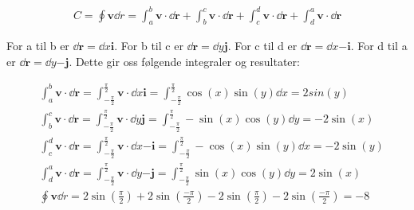 \begin{align*}
    C =  \oint \mathbf{v} \dd r
    =
    \int_{a}^{b} \mathbf{v} \cdot \dd \mathbf{r}
    +
    \int_{b}^{c} \mathbf{v} \cdot \dd \mathbf{r}
    +
    \int_{c}^{d} \mathbf{v} \cdot \dd \mathbf{r}
    +
    \int_{d}^{a} \mathbf{v} \cdot \dd \mathbf{r}
\end{align*}

For a til b er $\dd \mathbf{r} = \dd x \mathbf{i}$.
For b til c er $\dd \mathbf{r} = \dd y \mathbf{j}$.
For c til d er $\dd \mathbf{r} = \dd x \mathbf{-i}$.
For d til a er $\dd \mathbf{r} = \dd y \mathbf{-j}$.
Dette gir oss følgende integraler og resultater:

\begin{align*}
    &\int_{a}^{b} \mathbf{v} \cdot \dd \mathbf{r}
    =
    \int_{-\frac{\pi}{2}}^{\frac{\pi}{2}}
    \mathbf{v} \cdot \dd x \mathbf{i}
    =
    \int_{-\frac{\pi}{2}}^{\frac{\pi}{2}}
    \cos(x)\sin(y) \dd x
    = 2 sin(y)
    \\
    &\int_{b}^{c} \mathbf{v} \cdot \dd \mathbf{r}
    =
    \int_{-\frac{\pi}{2}}^{\frac{\pi}{2}}
    \mathbf{v} \cdot \dd y \mathbf{j}
    =
    \int_{-\frac{\pi}{2}}^{\frac{\pi}{2}}
    - \sin(x)\cos(y) \dd y
    = -2\sin(x)
    \\
    &\int_{c}^{d} \mathbf{v} \cdot \dd \mathbf{r}
    =
    \int_{-\frac{\pi}{2}}^{\frac{\pi}{2}}
    \mathbf{v} \cdot \dd x \mathbf{-i}
    =
    \int_{-\frac{\pi}{2}}^{\frac{\pi}{2}}
    -\cos(x)\sin(y) \dd x
    = -2 \sin(y)
    \\
    &\int_{d}^{a} \mathbf{v} \cdot \dd \mathbf{r}
    =
    \int_{-\frac{\pi}{2}}^{\frac{\pi}{2}}
    \mathbf{v} \cdot \dd y \mathbf{-j}
    =
    \int_{-\frac{\pi}{2}}^{\frac{\pi}{2}}
    \sin(x)\cos(y) \dd y
    = 2 \sin(x)
    \\
    &\oint \mathbf{v} \dd r
    =
    2\sin(\frac{\pi}{2})
    + 2\sin(\frac{-\pi}{2})
    - 2\sin(\frac{\pi}{2})
    - 2\sin(\frac{-\pi}{2}) = -8
\end{align*}
















